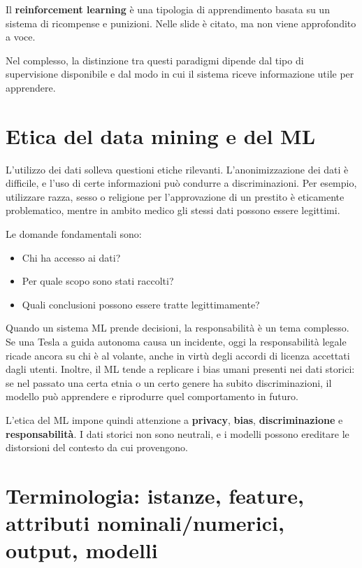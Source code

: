 \begin{notaslide}
Il \textbf{reinforcement learning} è una tipologia di apprendimento basata su un sistema di ricompense e punizioni. Nelle slide è citato, ma non viene approfondito a voce.
\end{notaslide}

Nel complesso, la distinzione tra questi paradigmi dipende dal tipo di supervisione disponibile e dal modo in cui il sistema riceve informazione utile per apprendere.

\section{Etica del data mining e del ML}

L'utilizzo dei dati solleva questioni etiche rilevanti. L'anonimizzazione dei dati è difficile, e l'uso di certe informazioni può condurre a discriminazioni. Per esempio, utilizzare razza, sesso o religione per l'approvazione di un prestito è eticamente problematico, mentre in ambito medico gli stessi dati possono essere legittimi.

Le domande fondamentali sono:
\begin{itemize}
    \item Chi ha accesso ai dati?
    \item Per quale scopo sono stati raccolti?
    \item Quali conclusioni possono essere tratte legittimamente?
\end{itemize}

\begin{notaprof}
Quando un sistema ML prende decisioni, la responsabilità è un tema complesso. Se una Tesla a guida autonoma causa un incidente, oggi la responsabilità legale ricade ancora su chi è al volante, anche in virtù degli accordi di licenza accettati dagli utenti. Inoltre, il ML tende a replicare i bias umani presenti nei dati storici: se nel passato una certa etnia o un certo genere ha subito discriminazioni, il modello può apprendere e riprodurre quel comportamento in futuro.
\end{notaprof}

L'etica del ML impone quindi attenzione a \textbf{privacy}, \textbf{bias}, \textbf{discriminazione} e \textbf{responsabilità}. I dati storici non sono neutrali, e i modelli possono ereditare le distorsioni del contesto da cui provengono.

\section{Terminologia: istanze, feature, attributi nominali/numerici, output, modelli}

